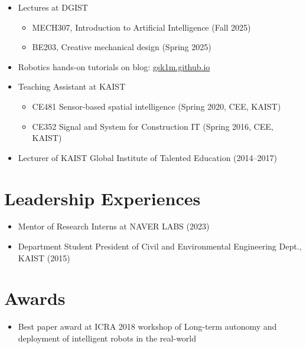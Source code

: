 \documentclass{cv} %
\begin{document}
\begin{itemize}[label=$\cdot$]
    \item Lectures at DGIST
        \begin{itemize}[label=$\cdot$]
        \item MECH307, Introduction to Artificial Intelligence (Fall 2025)
        \item BE203, Creative mechanical design (Spring 2025)
        \end{itemize}
    \item Robotics hands-on tutorials on blog: \href{https://gsk1m.github.io}{gsk1m.github.io}
        \vspace{-1mm}
    \item Teaching Assistant at KAIST
        \vspace{-1mm}
        \begin{itemize}[label=$\cdot$]
        \item CE481 Sensor-based spatial intelligence (Spring 2020, CEE, KAIST)
        \vspace{-1mm}
        \item CE352 Signal and System for Construction IT (Spring 2016, CEE, KAIST)
    \end{itemize}
        \vspace{-1mm}
    \item Lecturer of KAIST Global Institute of Talented Education (2014--2017)
\end{itemize}

\section{Leadership Experiences}
\begin{itemize}[label=$\cdot$]
\item Mentor of Research Interns at NAVER LABS (2023) 
        \vspace{-1mm}
\item Department Student President of Civil and Environmental Engineering Dept., KAIST (2015) 
\end{itemize}

\section{Awards}
\begin{itemize}[label=$\cdot$]
\item Best paper award at ICRA 2018 workshop of Long-term autonomy and deployment of intelligent robots in the real-world
\end{itemize}
\end{document}
